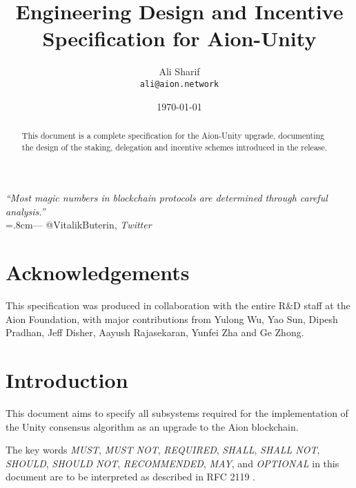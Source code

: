 \documentclass{article}
\title{Engineering Design and Incentive\\Specification for Aion-Unity}
\author{
    Ali Sharif\\
    \texttt{ali@aion.network}
}
\date{\today}
\begin{document}
\maketitle

\begin{flushright}
\rightskip=1.8cm\textit{``Most magic numbers in blockchain protocols are determined through careful analysis.''} \\
\vspace{.2em}
\rightskip=.8cm--- @VitalikButerin, \textit{Twitter}
\end{flushright}
\vspace{1em}

\begin{abstract}
This document is a complete specification for the Aion-Unity upgrade, documenting the design of the staking, delegation and incentive schemes introduced in the release. 
\end{abstract}

\section*{Acknowledgements}
This specification was produced in collaboration with the entire R\&D staff at the Aion Foundation, with major contributions from Yulong Wu, Yao Sun, Dipesh Pradhan, Jeff Disher, Aayush Rajasekaran, Yunfei Zha and Ge Zhong. 

\section{Introduction}
This document aims to specify all subsystems required for the implementation of the Unity consensus algorithm \cite{WZS19} as an upgrade to the Aion blockchain.

The key words \textit{MUST}, \textit{MUST NOT}, \textit{REQUIRED}, \textit{SHALL}, \textit{SHALL NOT}, \textit{SHOULD}, \textit{SHOULD NOT}, \textit{RECOMMENDED}, \textit{MAY}, and \textit{OPTIONAL} in this document are to be interpreted as described in RFC 2119 \cite{RFC2119}.





\end{document}
